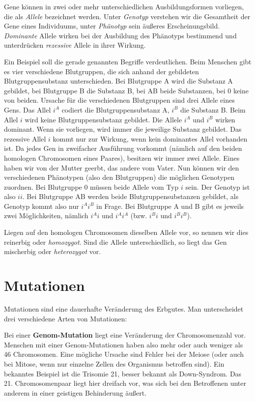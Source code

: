 Gene können in zwei oder mehr unterschiedlichen Ausbildungsformen vorliegen, die als \emph{Allele} bezeichnet werden. Unter \emph{Genotyp} verstehen wir die Gesamtheit der Gene eines Individuums, unter \emph{Phänotyp} sein äußeres Erscheinungsbild. \emph{Dominante} Allele wirken bei der Ausbildung des Phänotyps bestimmend und unterdrücken \emph{rezessive} Allele in ihrer Wirkung. 

Ein Beispiel soll die gerade genannten Begriffe verdeutlichen. Beim Menschen gibt es vier verschiedene Blutgruppen, die sich anhand der gebildeten Blutgruppensubstanz unterschieden. Bei Blutgruppe A wird die Substanz A gebildet, bei Blutgruppe B die Substanz B, bei AB beide Substanzen, bei 0 keine von beiden. Ursache für die verschiedenen Blutgruppen sind drei Allele eines Gens. Das Allel $i^A$ codiert die Blutgruppensubstanz A, $i^B$ die Substanz B. Beim Allel $i$ wird keine Blutgruppensubstanz gebildet. Die Allele $i^A$ und $i^B$ wirken dominant. Wenn sie vorliegen, wird immer die jeweilige Substanz gebildet. Das rezessive Allel $i$ kommt nur zur Wirkung, wenn kein dominantes Allel vorhanden ist. Da jedes Gen in zweifacher Ausführung vorkommt (nämlich auf den beiden homologen Chromosomen eines Paares), besitzen wir immer zwei Allele. Eines haben wir von der Mutter geerbt, das andere vom Vater. Nun können wir den verschiedenen Phänotypen (also den Blutgruppen) die  möglichen Genotypen zuordnen. Bei Blutgruppe 0 müssen beide Allele vom Typ $i$ sein. Der Genotyp ist also $ii$. Bei Blutgruppe AB werden beide Blutgruppensubstanzen gebildet, als Genotyp kommt also nur $i^Ai^B$ in Frage. Bei Blutgruppe A und B gibt es jeweils zwei Möglichkeiten, nämlich $i^Ai$ und $i^Ai^A$ (bzw. $i^Bi$ und $i^Bi^B$).

Liegen auf den homologen Chromosomen dieselben Allele vor, so nennen wir dies reinerbig oder \emph{homozygot}. Sind die Allele unterschiedlich, so liegt das Gen mischerbig oder \emph{heterozygot} vor.

\section{Mutationen}
\label{sec:bio:muta}

Mutationen sind eine dauerhafte Veränderung des Erbgutes. Man unterscheidet drei verschiedene Arten von Mutationen:

Bei einer \textbf{Genom-Mutation} liegt eine Veränderung der Chromosomenzahl vor. Menschen mit einer Genom-Mutationen haben also mehr oder auch weniger als 46 Chromosomen. Eine mögliche Ursache sind Fehler bei der Meiose (oder auch bei Mitose, wenn nur einzelne Zellen des Organismus betroffen sind). Ein bekanntes Beispiel ist die Trisomie 21, besser bekannt als Down-Syndrom. Das 21. Chromosomenpaar liegt hier dreifach vor, was sich bei den Betroffenen unter anderem in einer geistigen Behinderung äußert.

